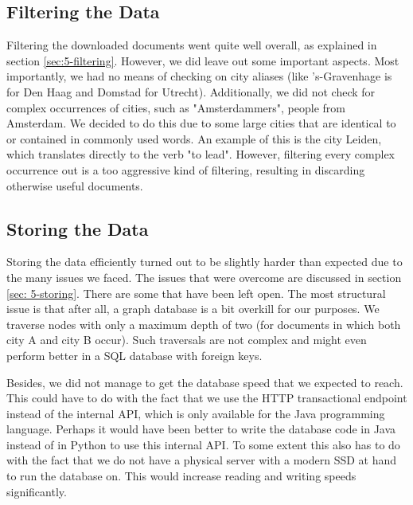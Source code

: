 \subsection{Filtering the Data}
Filtering the downloaded documents went quite well overall, as explained in section \ref{sec:5-filtering}. However, we did leave out some important aspects. Most importantly, we had no means of checking on city aliases (like 's-Gravenhage is for Den Haag and Domstad for Utrecht). Additionally, we did not check for complex occurrences of cities, such as "Amsterdammers", people from Amsterdam.  We decided to do this due to some large cities that are identical to or contained in commonly used words. An example of this is the city Leiden, which translates directly to the verb "to lead". However, filtering every complex occurrence out is a too aggressive kind of filtering, resulting in discarding otherwise useful documents.

\subsection{Storing the Data}
Storing the data efficiently turned out to be slightly harder than expected due to the many issues we faced. The issues that were overcome are discussed in section \ref{sec: 5-storing}. There are some that have been left open. The most structural issue is that after all, a graph database is a bit overkill for our purposes. We traverse nodes with only a maximum depth of two (for documents in which both city A and city B occur). Such traversals are not complex and might even perform better in a SQL database with foreign keys.

Besides, we did not manage to get the database speed that we expected to reach. This could have to do with the fact that we use the HTTP transactional endpoint instead of the internal API, which is only available for the Java programming language. Perhaps it would have been better to write the database code in Java instead of in Python to use this internal API. To some extent this also has to do with the fact that we do not have a physical server with a modern SSD at hand to run the database on. This would increase reading and writing speeds significantly.

